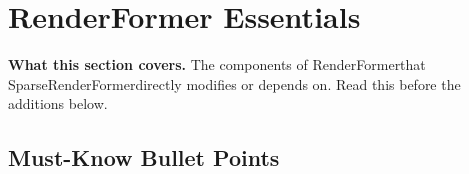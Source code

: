 \documentclass[11pt,letterpaper]{article}
\newcommand{\ours}{SparseRenderFormer}
\newcommand{\RF}{RenderFormer}
\begin{document}
\section{RenderFormer Essentials}

\begin{mdframed}[linecolor=black!30, backgroundcolor=gray!5]
\textbf{What this section covers.}
The components of \RF that \ours directly modifies or depends on.
Read this before the additions below.
\end{mdframed}

\subsection*{Must-Know Bullet Points}
\end{document}
